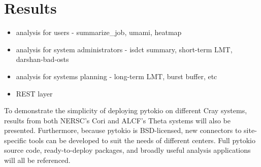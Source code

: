 \section{Results}

\begin{itemize}
\item analysis for users - summarize\_job, umami, heatmap
\item analysis for system administrators - isdct summary, short-term LMT, darshan-bad-osts
\item analysis for systems planning - long-term LMT, burst buffer, etc
\item REST layer
\end{itemize}



To demonstrate the simplicity of deploying pytokio on different Cray systems, results from both NERSC's Cori and ALCF's Theta systems will also be presented.  Furthermore, because pytokio is BSD-licensed, new connectors to site-specific tools can be developed to suit the needs of different centers.  Full pytokio source code, ready-to-deploy packages, and broadly useful analysis applications will all be referenced.